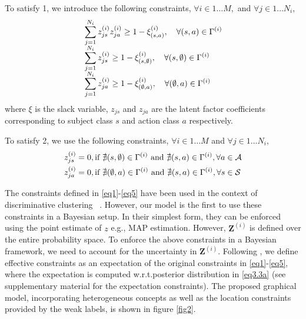 \documentclass[runningheads]{llncs}
\begin{document}
To satisfy 1, we introduce the following constraints, $\forall i \in 1\dots M,$ and $\forall j \in 1\dots N_i$,
\vspace{-2mm}
\begin{align}
\vspace{-4mm}
& \sum_{j=1}^{N_i} z_{js}^{(i)} z_{ja}^{(i)} \geq 1 - \xi_{(s,a)}^{(i)}, \quad \forall (s,a)\in \Gamma^{(i)} \label{eq1} \\[-0.5em]
\vspace{-2mm}
& \sum_{j=1}^{N_i} z_{js}^{(i)} \geq 1 - \xi_{(s,\emptyset)}^{(i)}, \quad \forall (s,\emptyset)\in \Gamma^{(i)} \label{eq2}\\[-0.5em]
\vspace{-2mm}
& \sum_{j=1}^{N_i}  z_{ja}^{(i)} \geq 1 - \xi_{(\emptyset,a)}^{(i)}, \quad \forall (\emptyset,a)\in \Gamma^{(i)} \label{eq3}
\end{align}
where $\xi$ is the slack variable, $z_{js}$ and $z_{ja}$ are the latent factor coefficients corresponding to subject class $s$ and action class $a$ respectively. 

To satisfy 2, we use the following constraints, $\forall i \in 1\dots M$ and $\forall j \in 1\dots N_i$,
\vspace{-1mm} 
\begin{align}
 z_{js}^{(i)} &= 0, \text{if } \nexists (s,\emptyset)\in\Gamma^{(i)} \text{ and } \nexists (s,a) \in \Gamma^{(i)}, \forall a \in \mathcal{A}\label{eq4}\\
 z_{ja}^{(i)} &= 0,  \text{if } \nexists (\emptyset,a)\in\Gamma^{(i)} \text{ and } \nexists  (s,a) \in \Gamma^{(i)},  \forall s \in \mathcal{S} \label{eq5}
\vspace{-2mm} 
\end{align}
\vspace{-6mm} 

The constraints defined in \eqref{eq1}-\eqref{eq5} have been used in the context of discriminative clustering ~\cite{ramanathan2014linking,bojanowski2013finding}. However, our model is the first to use these constraints in a Bayesian setup. In their simplest form, they can be enforced using the  point estimate of $z$ e.g., MAP estimation. However, $\mathbf{Z}^{(i)}$ is defined over the entire probability space. To enforce the above constraints in a Bayesian framework, we need to account for the uncertainty in $\mathbf{Z}^{(i)}$. Following \cite{zhu2014bayesian,ganchev2010posterior}, we define effective constraints as an expectation of the original constraints in \eqref{eq1}-\eqref{eq5}, where the expectation is computed w.r.t.\the posterior distribution in \eqref{eq3.3a} (see supplementary material for the expectation constraints). The proposed graphical model, incorporating heterogeneous concepts as well as the location constraints provided by the weak labels, is shown in figure \ref{fig2}. 
\end{document}
